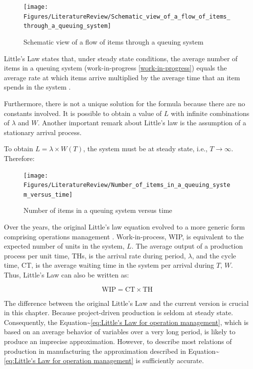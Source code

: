 \documentclass{article}
\begin{document}
\begin{figure}[H]
  \centering
  \texttt{[image: Figures/LiteratureReview/Schematic\_view\_of\_a\_flow\_of\_items\_through\_a\_queuing\_system]}
  \caption{Schematic view of a flow of items through a queuing system}\label{fig:Schematic view of a flow of items through a queuing system}
\end{figure}

Little's Law states that, under steady state conditions, the average number of items in a queuing system (work-in-progress \ref{work-in-progress}) equals the average rate at which items arrive multiplied by the average time that an item spends in the system \citep{Little2008}.

Furthermore, there is not a unique solution for the formula because there are no constants involved.
It is possible to obtain a value of \(L\) with infinite combinations of \(\lambda\) and \(W\).
Another important remark about Little's law is the assumption of a stationary arrival process.

To obtain \(L=\lambda \times W(T)\), the system must be at steady state, i.e., \(T \rightarrow \infty\).
Therefore:

\begin{figure}[H]
  \centering
  \texttt{[image: Figures/LiteratureReview/Number\_of\_items\_in\_a\_queuing\_system\_versus\_time]}
  \caption{Number of items in a queuing system versus time}\label{fig:Number of items in a queuing system versus time}
\end{figure}

Over the years, the original Little's law equation \citep{Little1961} evolved to a more generic form comprising operations management \citep{Hopp2001}.
Work-in-process, WIP, is equivalent to the expected number of units in the system, \(L\).
The average output of a production process per unit time, THs, is the arrival rate during period, \(\lambda\), and the cycle time, CT, is the average waiting time in the system per arrival during \(T\), \(W\).
Thus, Little's Law can also be written as:

\begin{equation}
  \mbox{WIP} = \mbox{CT} \times \mbox{TH}
   \label{eq:Little's Law for operation management}
\end{equation}

The difference between the original Little's Law and the current version is crucial in this chapter.
Because project-driven production is seldom at steady state.
Consequently, the Equation\textasciitilde{}\ref{eq:Little's Law for operation management}, which is based on an average behavior of variables over a very long period, is likely to produce an imprecise approximation.
However, to describe most relations of production in manufacturing the approximation described in Equation\textasciitilde{}\ref{eq:Little's Law for operation management} is sufficiently accurate.
\end{document}
